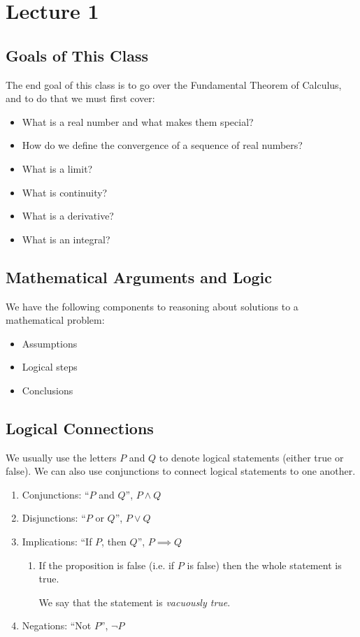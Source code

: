 \documentclass[class=article, crop=false]{standalone}
\begin{document}
  \section{Lecture 1}
  \subsection{Goals of This Class}
  The end goal of this class is to go over the Fundamental Theorem of Calculus, and to do that we must first cover:
  \begin{itemize}
    \item What is a real number and what makes them special?
    \item How do we define the convergence of a sequence of real numbers?
    \item What is a limit?
    \item What is continuity?
    \item What is a derivative?
    \item What is an integral?
  \end{itemize}
  \subsection{Mathematical Arguments and Logic}
  We have the following components to reasoning about solutions to a mathematical problem:
  \begin{itemize}
    \item Assumptions
    \item Logical steps
    \item Conclusions
  \end{itemize}
  \subsection{Logical Connections}
  We usually use the letters $P$ and $Q$ to denote logical statements (either true or false). We can also use conjunctions to connect logical statements to one another.
  \begin{enumerate}
    \item Conjunctions: ``$P$ and $Q$'', $P\land Q$
    \item Disjunctions: ``$P$ or $Q$'', $P\lor Q$
    \item Implications: ``If $P$, then $Q$'', $P\implies Q$
    \begin{enumerate}
      \item If the proposition is false (i.e. if $P$ is false) then the whole statement is true.
      \begin{definition}{}
        We say that the statement is \emph{vacuously true}.
      \end{definition}
    \end{enumerate}
    \item Negations: ``Not $P$'', $\neg P$
  \end{enumerate}
\end{document}
